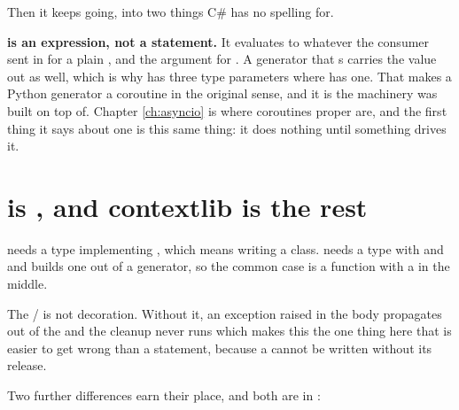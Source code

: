 \noindent
Then it keeps going, into two things C\# has no spelling for.




\begin{trapbox}
\textbf{ is an expression, not a statement.} It evaluates to
whatever the consumer sent in \dash{}  for a plain
, and the argument for . A generator that
s carries the value out as well, which is why
 has three type parameters where  has
one. That makes a Python generator a coroutine in the original sense, and
it is the machinery  was built on top of. Chapter
\ref{ch:asyncio} is where coroutines proper are, and the first thing it
says about one is this same thing: it does nothing until something drives
it.
\end{trapbox}

\section{ is , and contextlib is the rest}
\label{sec:ch05-with}

 needs a type implementing ,
which means writing a class.  needs a type with
 and  \dash{} and
 builds one out of a generator, so the
common case is a function with a  in the middle.


\begin{warning}
The / is not decoration. Without it, an exception
raised in the body propagates out of the  and the cleanup never
runs \dash{} which makes this the one thing here that is easier to get
wrong than a  statement, because a  cannot be
written without its release.
\end{warning}

\noindent
Two further differences earn their place, and both are in
:

